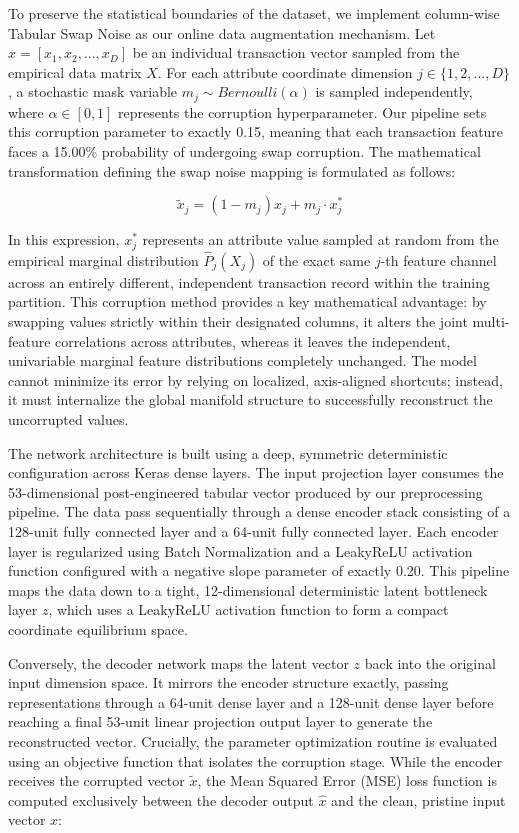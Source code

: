 \documentclass[11pt,a4paper]{report}
\begin{document}
To preserve the statistical boundaries of the dataset, we implement column-wise Tabular Swap Noise as our online data augmentation mechanism. Let $x=[x_{1},x_{2},...,x_{D}]$ be an individual transaction vector sampled from the empirical data matrix $X$. For each attribute coordinate dimension $j\in\{1,2,...,D\}$, a stochastic mask variable $m_{j}\sim Bernoulli(\alpha)$ is sampled independently, where $\alpha\in[0,1]$ represents the corruption hyperparameter. Our pipeline sets this corruption parameter to exactly 0.15, meaning that each transaction feature faces a 15.00\% probability of undergoing swap corruption. The mathematical transformation defining the swap noise mapping is formulated as follows:

\begin{equation}
\tilde{x}_{j}=(1-m_{j})x_{j}+m_{j}\cdot x_{j}^{*}
\end{equation}

In this expression, $x_{j}^{*}$ represents an attribute value sampled at random from the empirical marginal distribution $\hat{P}_{j}(X_{j})$ of the exact same $j$-th feature channel across an entirely different, independent transaction record within the training partition. This corruption method provides a key mathematical advantage: by swapping values strictly within their designated columns, it alters the joint multi-feature correlations across attributes, whereas it leaves the independent, univariable marginal feature distributions completely unchanged. The model cannot minimize its error by relying on localized, axis-aligned shortcuts; instead, it must internalize the global manifold structure to successfully reconstruct the uncorrupted values. 

The network architecture is built using a deep, symmetric deterministic configuration across Keras dense layers. The input projection layer consumes the 53-dimensional post-engineered tabular vector produced by our preprocessing pipeline. The data pass sequentially through a dense encoder stack consisting of a 128-unit fully connected layer and a 64-unit fully connected layer. Each encoder layer is regularized using Batch Normalization and a LeakyReLU activation function configured with a negative slope parameter of exactly 0.20. This pipeline maps the data down to a tight, 12-dimensional deterministic latent bottleneck layer $z$, which uses a LeakyReLU activation function to form a compact coordinate equilibrium space. 

Conversely, the decoder network maps the latent vector $z$ back into the original input dimension space. It mirrors the encoder structure exactly, passing representations through a 64-unit dense layer and a 128-unit dense layer before reaching a final 53-unit linear projection output layer to generate the reconstructed vector. Crucially, the parameter optimization routine is evaluated using an objective function that isolates the corruption stage. While the encoder receives the corrupted vector $\tilde{x}$, the Mean Squared Error (MSE) loss function is computed exclusively between the decoder output $\hat{x}$ and the clean, pristine input vector $x$:
\end{document}
